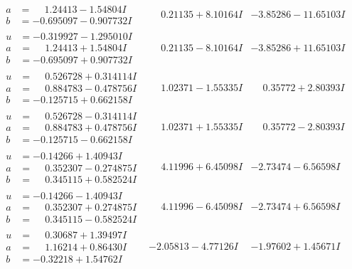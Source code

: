 \documentclass[1p]{elsarticle_modified}
\theoremstyle{definition}
\begin{document}
$$\begin{array}{c|c|c}
\begin{aligned}
a &= \phantom{-}1.24413 - 1.54804 I \\
b &= -0.695097 - 0.907732 I\end{aligned}
 & \phantom{-}0.21135 + 8.10164 I & -3.85286 - 11.65103 I \\ \hline\begin{aligned}
u &= -0.319927 - 1.295010 I \\
a &= \phantom{-}1.24413 + 1.54804 I \\
b &= -0.695097 + 0.907732 I\end{aligned}
 & \phantom{-}0.21135 - 8.10164 I & -3.85286 + 11.65103 I \\ \hline\begin{aligned}
u &= \phantom{-}0.526728 + 0.314114 I \\
a &= \phantom{-}0.884783 - 0.478756 I \\
b &= -0.125715 + 0.662158 I\end{aligned}
 & \phantom{-}1.02371 - 1.55335 I & \phantom{-}0.35772 + 2.80393 I \\ \hline\begin{aligned}
u &= \phantom{-}0.526728 - 0.314114 I \\
a &= \phantom{-}0.884783 + 0.478756 I \\
b &= -0.125715 - 0.662158 I\end{aligned}
 & \phantom{-}1.02371 + 1.55335 I & \phantom{-}0.35772 - 2.80393 I \\ \hline\begin{aligned}
u &= -0.14266 + 1.40943 I \\
a &= \phantom{-}0.352307 - 0.274875 I \\
b &= \phantom{-}0.345115 + 0.582524 I\end{aligned}
 & \phantom{-}4.11996 + 6.45098 I & -2.73474 - 6.56598 I \\ \hline\begin{aligned}
u &= -0.14266 - 1.40943 I \\
a &= \phantom{-}0.352307 + 0.274875 I \\
b &= \phantom{-}0.345115 - 0.582524 I\end{aligned}
 & \phantom{-}4.11996 - 6.45098 I & -2.73474 + 6.56598 I \\ \hline\begin{aligned}
u &= \phantom{-}0.30687 + 1.39497 I \\
a &= \phantom{-}1.16214 + 0.86430 I \\
b &= -0.32218 + 1.54762 I\end{aligned}
 & -2.05813 - 4.77126 I & -1.97602 + 1.45671 I \\ \hline\begin{aligned}

\end{aligned}
\end{array}$$
\end{document}
